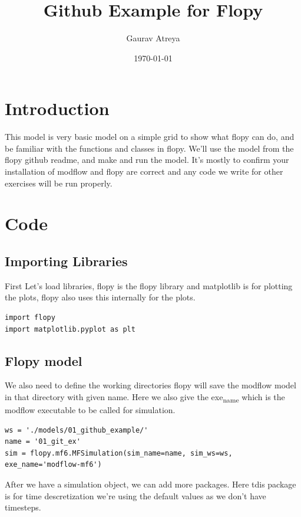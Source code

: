 \documentclass[titlepage,12pt]{unisubmission}
\author{Gaurav Atreya}
\date{\today}
\title{Github Example for Flopy}
\begin{document}
\maketitle
\setcounter{tocdepth}{2}
\tableofcontents
\section{Introduction}
\label{sec:org97f6941}
This model is very basic model on a simple grid to show what flopy can do, and be familiar with the functions and classes in flopy. We'll use the model from the flopy github readme, and make and run the model. It's mostly to confirm your installation of modflow and flopy are correct and any code we write for other exercises will be run properly.

\section{Code}
\label{sec:orgf5c47b5}

\subsection{Importing Libraries}
\label{sec:org393517c}
First Let's load libraries, flopy is the flopy library and matplotlib is for plotting the plots, flopy also uses this internally for the plots.

\begin{verbatim}
import flopy
import matplotlib.pyplot as plt
\end{verbatim}

\subsection{Flopy model}
\label{sec:org68176e2}
We also need to define the working directories flopy will save the modflow model in that directory with given name. Here we also give the exe\textsubscript{name} which is the modflow executable to be called for simulation.

\begin{verbatim}
ws = './models/01_github_example/'
name = '01_git_ex'
sim = flopy.mf6.MFSimulation(sim_name=name, sim_ws=ws, exe_name='modflow-mf6')
\end{verbatim}


After we have a simulation object, we can add more packages. Here tdis package is for time descretization we're using the default values as we don't have timesteps.
\end{document}
